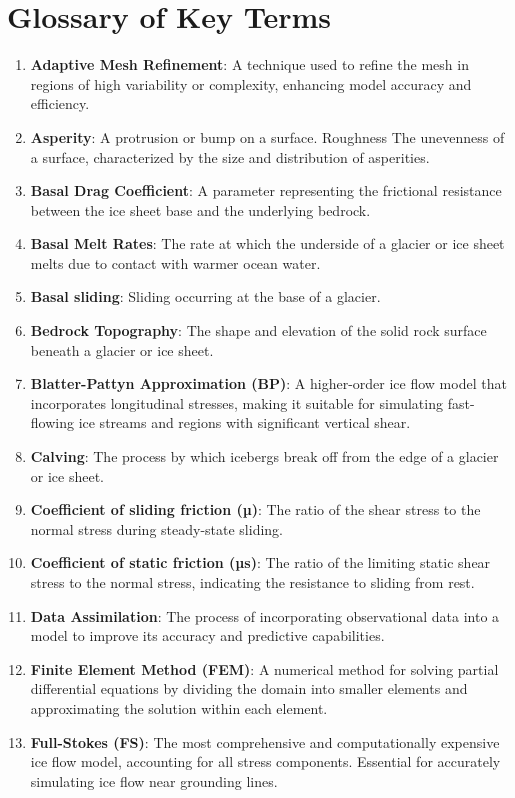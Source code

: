 \chapter{Glossary of Key Terms}\label{glossary}
\begin{enumerate}
\item \textbf{Adaptive Mesh Refinement}: A technique used to refine the mesh in regions of high variability or complexity, enhancing model accuracy and efficiency.
\item \textbf{Asperity}: A protrusion or bump on a surface. Roughness The unevenness of a surface, characterized by the size and distribution of asperities.
\item \textbf{Basal Drag Coefficient}: A parameter representing the frictional resistance between the ice sheet base and the underlying bedrock.
\item \textbf{Basal Melt Rates}: The rate at which the underside of a glacier or ice sheet melts due to contact with warmer ocean water.
\item \textbf{Basal sliding}: Sliding occurring at the base of a glacier.
\item \textbf{Bedrock Topography}: The shape and elevation of the solid rock surface beneath a glacier or ice sheet.
\item \textbf{Blatter-Pattyn Approximation (BP)}: A higher-order ice flow model that incorporates longitudinal stresses, making it suitable for simulating fast-flowing ice streams and regions with significant vertical shear.
\item \textbf{Calving}: The process by which icebergs break off from the edge of a glacier or ice sheet.
\item \textbf{Coefficient of sliding friction (µ)}: The ratio of the shear stress to the normal stress during steady-state sliding.
\item \textbf{Coefficient of static friction (µs)}: The ratio of the limiting static shear stress to the normal stress, indicating the resistance to sliding from rest.
\item \textbf{Data Assimilation}: The process of incorporating observational data into a model to improve its accuracy and predictive capabilities.
\item \textbf{Finite Element Method (FEM)}: A numerical method for solving partial differential equations by dividing the domain into smaller elements and approximating the solution within each element.
\item \textbf{Full-Stokes (FS)}: The most comprehensive and computationally expensive ice flow model, accounting for all stress components. Essential for accurately simulating ice flow near grounding lines.

\end{enumerate}
